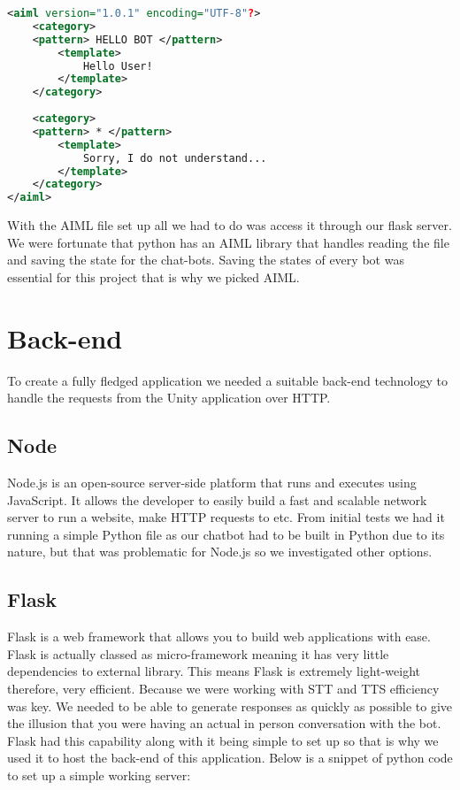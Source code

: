 \begin{lstlisting}[language=XML]
<aiml version="1.0.1" encoding="UTF-8"?>
    <category>
    <pattern> HELLO BOT </pattern>
        <template>
            Hello User!
        </template>
    </category>
    
    <category>
    <pattern> * </pattern>
        <template>
            Sorry, I do not understand...
        </template>
    </category>
</aiml>

\end{lstlisting}

With the AIML file set up all we had to do was access it through our flask server. We were fortunate that python has an AIML library that handles reading the file and saving the state for the chat-bots. Saving the states of every bot was essential for this project that is why we picked AIML.

\section{Back-end}
To create a fully fledged application we needed a suitable back-end technology to handle the requests from the Unity application over HTTP.

\subsection{Node}
Node.js is an open-source server-side platform that runs and executes using JavaScript. It allows the developer to easily build a fast and scalable network server to run a website, make HTTP requests to etc. From initial tests we had it running a simple Python file as our chatbot had to be built in Python due to its nature, but that was problematic for Node.js so we investigated other options.

\subsection{Flask}
Flask is a web framework that allows you to build web applications with ease. Flask is actually classed as micro-framework meaning it has very little dependencies to external library. This means Flask is extremely light-weight therefore, very efficient. Because we were working with STT and TTS efficiency was key. We needed to be able to generate responses as quickly as possible to give the illusion that you were having an actual in person conversation with the bot. Flask had this capability along with it being simple to set up so that is why we used it to host the back-end of this application. Below is a snippet of python code to set up a simple working server:

